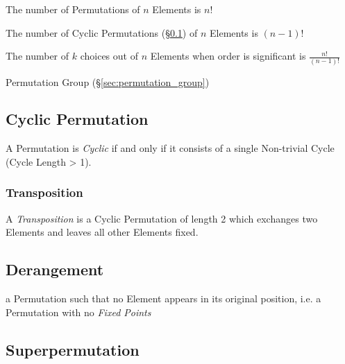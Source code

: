The number of Permutations of $n$ Elements is $n!$

The number of Cyclic Permutations (\S\ref{sec:cyclic_permutation}) of $n$
Elements is $(n-1)!$

The number of $k$ choices out of $n$ Elements when order is significant is
$\frac{n!}{(n-1)!}$

Permutation Group (\S\ref{sec:permutation_group})



\subsection{Cyclic Permutation}\label{sec:cyclic_permutation}

A Permutation is \emph{Cyclic} if and only if it consists of a single
Non-trivial Cycle (Cycle Length > 1).



\subsubsection{Transposition}\label{sec:transposition}

A \emph{Transposition} is a Cyclic Permutation of length 2 which exchanges two
Elements and leaves all other Elements fixed.



\subsection{Derangement}\label{sec:derangement}

a Permutation such that no Element appears in its original position, i.e. a
Permutation with no \emph{Fixed Points}



\subsection{Superpermutation}\label{sec:superpermutation}

